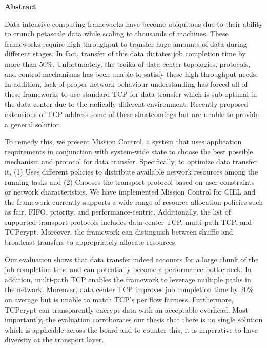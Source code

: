 \newpage
{\Huge \bf Abstract}
\vspace{24pt} 


Data intensive computing frameworks have become ubiquitous due to their ability
to crunch petascale data while scaling to thousands of machines. These
frameworks require high throughput to transfer huge amounts of data during
different stages. In fact, transfer of this data dictates job completion time by
more than 50\%. Unfortunately, the troika of data center topologies, protocols,
and control mechanisms has been unable to satisfy these high throughput needs.
In addition, lack of proper network behaviour understanding has forced all of
these frameworks to use standard TCP for data transfer which is sub-optimal in
the data center due to the radically different environment. Recently proposed
extensions of TCP address some of these shortcomings but are unable to provide a
general solution.

To remedy this, we present Mission Control, a system that uses application
requirements in conjunction with system-wide state to choose the best possible
mechanism and protocol for data transfer. Specifically, to optimize data
transfer it, (1) Uses different policies to distribute available network
resources among the running tasks and (2) Chooses the transport protocol based
on user-constraints or network characteristics. We have implemented Mission
Control for CIEL and the framework currently supports a wide range of resource
allocation policies such as fair, FIFO, priority, and performance-centric.
Additionally, the list of supported transport protocols includes data center
TCP, multi-path TCP, and TCPcrypt. Moreover, the framework can distinguish
between shuffle and broadcast transfers to appropriately allocate resources.

Our evaluation shows that data transfer indeed accounts for a large chunk of the
job completion time and can potentially become a performance bottle-neck. In
addition, multi-path TCP enables the framework to leverage multiple paths in the
network. Moreover, data center TCP improves job completion time by 20\% on
average but is unable to match TCP's per flow fairness. Furthermore, TCPcrypt
can transparently encrypt data with an acceptable overhead. Most importantly,
the evaluation corroborates our thesis that there is no single solution which is
applicable across the board and to counter this, it is imperative to have
diversity at the transport layer.



\newpage
\vspace*{\fill}
